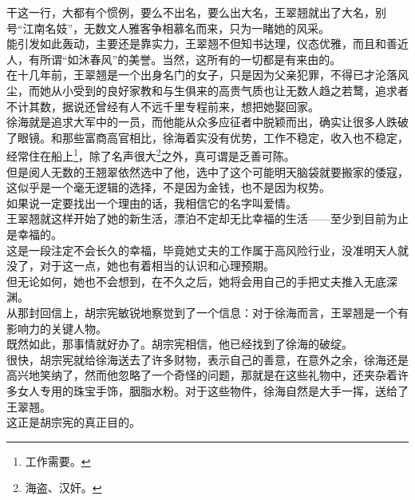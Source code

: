 \begin{multicols}{\theparacolNo}
干这一行，大都有个惯例，要么不出名，要么出大名，王翠翘就出了大名，别号“江南名妓”，无数文人雅客争相慕名而来，只为一睹她的风采。\\

能引发如此轰动，主要还是靠实力，王翠翘不但知书达理，仪态优雅，而且和善近人，有所谓“如沐春风”的美誉。当然，这所有的一切都是有来由的。\\

在十几年前，王翠翘是一个出身名门的女子，只是因为父亲犯罪，不得已才沦落风尘，而她从小受到的良好家教和与生俱来的高贵气质也让无数人趋之若鹜，追求者不计其数，据说还曾经有人不远千里专程前来，想把她娶回家。\\

徐海就是追求大军中的一员，而他能从众多应征者中脱颖而出，确实让很多人跌破了眼镜。和那些富商高官相比，徐海着实没有优势，工作不稳定，收入也不稳定，经常住在船上\footnote{工作需要。}，除了名声很大\footnote{海盗、汉奸。}之外，真可谓是乏善可陈。\\

但是阅人无数的王翘翠依然选中了他，选中了这个可能明天脑袋就要搬家的倭寇，这似乎是一个毫无逻辑的选择，不是因为金钱，也不是因为权势。\\

如果说一定要找出一个理由的话，我相信它的名字叫爱情。\\

王翠翘就这样开始了她的新生活，漂泊不定却无比幸福的生活——至少到目前为止是幸福的。\\

这是一段注定不会长久的幸福，毕竟她丈夫的工作属于高风险行业，没准明天人就没了，对于这一点，她也有着相当的认识和心理预期。\\

但无论如何，她也不会想到，在不久之后，她将会用自己的手把丈夫推入无底深渊。\\

从那封回信上，胡宗宪敏锐地察觉到了一个信息：对于徐海而言，王翠翘是一个有影响力的关键人物。\\

既然如此，那事情就好办了。胡宗宪相信，他已经找到了徐海的破绽。\\

很快，胡宗宪就给徐海送去了许多财物，表示自己的善意，在意外之余，徐海还是高兴地笑纳了，然而他忽略了一个奇怪的问题，那就是在这些礼物中，还夹杂着许多女人专用的珠宝手饰，胭脂水粉。对于这些物件，徐海自然是大手一挥，送给了王翠翘。\\

这正是胡宗宪的真正目的。\\


\end{multicols}
